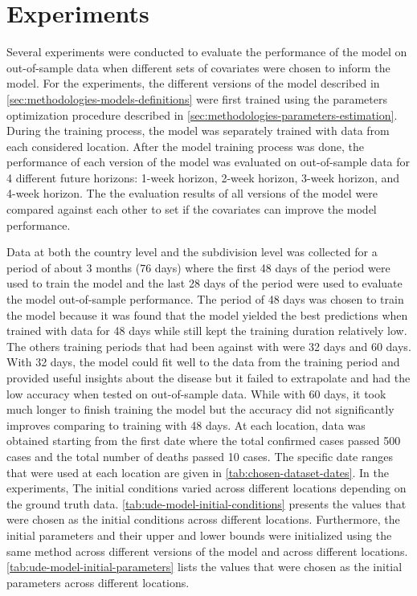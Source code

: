 \section{Experiments}
\label{sec:methodologies-experiments}

Several experiments were conducted to evaluate the performance of the model on out-of-sample data when different sets of covariates were chosen to inform the model.
For the experiments, the different versions of the model described in \autoref{sec:methodologies-models-definitions} were first trained using the parameters optimization procedure described in \autoref{sec:methodologies-parameters-estimation}.
During the training process, the model was separately trained with data from each considered location.
After the model training process was done, the performance of each version of the model was evaluated on out-of-sample data for 4 different future horizons: 1-week horizon, 2-week horizon, 3-week horizon, and 4-week horizon.
The the evaluation results of all versions of the model were compared against each other to set if the covariates can improve the model performance.

Data at both the country level and the subdivision level was collected for a period of about 3 months (76 days) where the first 48 days of the period were used to train the model and the last 28 days of the period were used to evaluate the model out-of-sample performance.
The period of 48 days was chosen to train the model because it was found that the model yielded the best predictions when trained with data for 48 days while still kept the training duration relatively low.
The others training periods that had been against with were 32 days and 60 days.
With 32 days, the model could fit well to the data from the training period and provided useful insights about the disease but it failed to extrapolate and had the low accuracy when tested on out-of-sample data.
While with 60 days, it took much longer to finish training the model but the accuracy did not significantly improves comparing to training with 48 days.
At each location, data was obtained starting from the first date where the total confirmed cases passed 500 cases and the total number of deaths passed 10 cases.
The specific date ranges that were used at each location are given in \autoref{tab:chosen-dataset-dates}.
In the experiments, The initial conditions varied across different locations depending on the ground truth data.
\autoref{tab:ude-model-initial-conditions} presents the values that were chosen as the initial conditions across different locations.
Furthermore, the initial parameters and their upper and lower bounds were initialized using the same method across different versions of the model and across different locations.
\autoref{tab:ude-model-initial-parameters} lists the values that were chosen as the initial parameters across different locations.


